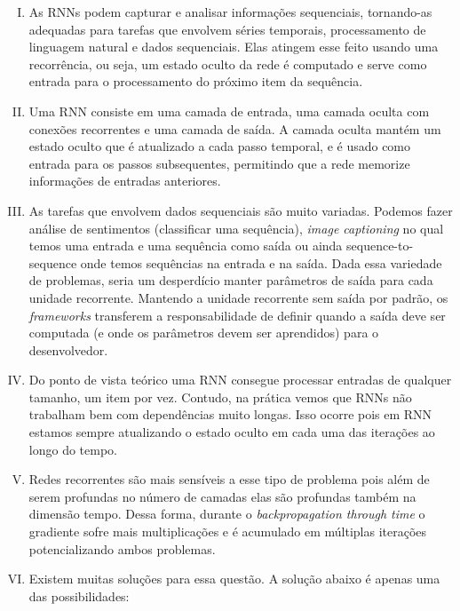 \documentclass{dlproblemset}
\begin{document}
\begin{enumerate}[I)]

    \item As RNNs podem capturar e analisar informações sequenciais, tornando-as adequadas para tarefas que envolvem séries temporais, processamento de linguagem natural e dados sequenciais. Elas atingem esse feito usando uma recorrência, ou seja, um estado oculto da rede é computado e serve como entrada para o processamento do próximo item da sequência.


    \item Uma RNN consiste em uma camada de entrada, uma camada oculta com conexões recorrentes e uma camada de saída. A camada oculta mantém um estado oculto que é atualizado a cada passo temporal, e é usado como entrada para os passos subsequentes, permitindo que a rede memorize informações de entradas anteriores.

    \item As tarefas que envolvem dados sequenciais são muito variadas. Podemos fazer análise de sentimentos (classificar uma sequência), \textit{image captioning} no qual temos uma entrada e uma sequência como saída ou ainda sequence-to-sequence onde temos sequências na entrada e na saída. Dada essa variedade de problemas, seria um desperdício manter parâmetros de saída para cada unidade recorrente. Mantendo a unidade recorrente sem saída por padrão, os \textit{frameworks} transferem a responsabilidade de definir quando a saída deve ser computada (e onde os parâmetros devem ser aprendidos) para o desenvolvedor.

    \item Do ponto de vista teórico uma RNN consegue processar entradas de qualquer tamanho, um item por vez. Contudo, na prática vemos que RNNs não trabalham bem com dependências muito longas. Isso ocorre pois em RNN estamos sempre atualizando o estado oculto em cada uma das iterações ao longo do tempo.

    \item Redes recorrentes são mais sensíveis a esse tipo de problema pois além de serem profundas no número de camadas elas são profundas também na dimensão tempo. Dessa forma, durante o \textit{backpropagation through time} o gradiente sofre mais multiplicações e é acumulado em múltiplas iterações potencializando ambos problemas.

    \item Existem muitas soluções para essa questão. A solução abaixo é apenas uma das possibilidades:
    

\end{enumerate}
\end{document}
